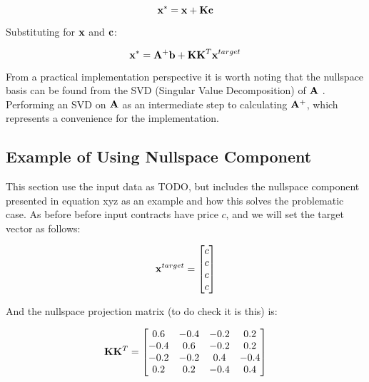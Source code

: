 \documentclass{article}
\begin{document}
\begin{equation}
    \mathbf{x}^* = \mathbf{x} + \mathbf{K}\mathbf{c}
\end{equation}

Substituting for $\mathbf{x}$ and $\mathbf{c}$:

\begin{equation}
    \mathbf{x}^* = \mathbf{A}^+ \mathbf{b} + \mathbf{K} \mathbf{K}^T \mathbf{x}^{target}
\end{equation}


From a practical implementation perspective it is worth noting that the nullspace
basis can be found from the SVD (Singular Value Decomposition) of $\mathbf{A}$ 
\footnotemark. Performing an
SVD on $\mathbf{A}$ as an intermediate step to calculating $\mathbf{A}^+$, which represents a
convenience for the implementation.


\subsection{Example of Using Nullspace Component}
This section use the input data as TODO, but includes the nullspace component presented
in equation xyz as an example and how this solves the problematic case. As before
before input contracts have price $c$, and we will set the target vector as follows:

\begin{equation}
    \mathbf{x}^{target} = \begin{bmatrix}
        c \\
        c \\
        c \\
        c \\
    \end{bmatrix}
\end{equation}

And the nullspace projection matrix (to do check it is this) is:

\begin{equation}
    \mathbf{K} \mathbf{K}^T = \begin{bmatrix}
        0.6 & -0.4 & -0.2 & 0.2  \\
        -0.4 & 0.6 & -0.2 & 0.2 \\
        -0.2 & -0.2 & 0.4 & -0.4 \\
        0.2 & 0.2 & -0.4 & 0.4
    \end{bmatrix}
\end{equation}
\end{document}

